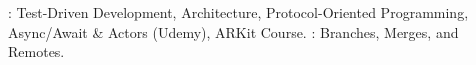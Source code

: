 : Test-Driven Development, Architecture, Protocol-Oriented Programming, Async/Await \& Actors (Udemy), ARKit Course.
: Branches, Merges, and Remotes.